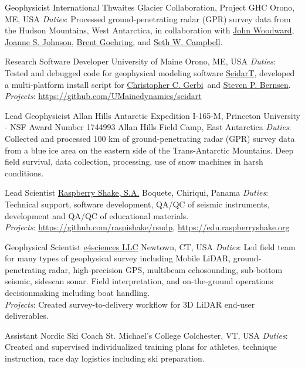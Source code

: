 \documentclass[a4paper,12pt,sans,colorlinks]{moderncv}
\newcommand{\seth}{\href{https://www.alpinesciences.net}{Seth W. Campbell}}
\newcommand{\stevebernsen}{\href{https://watc.alaska.edu/node/73}{Steven P. Bernsen}}
\newcommand{\chris}{\href{https://umaine.edu/earthclimate/people/christopher-gerbi/}{Christopher C. Gerbi}}
\newcommand{\johnwoodward}{\href{https://www.northumbria.ac.uk/about-us/our-staff/w/john-woodward}{John Woodward}}
\newcommand{\joannejohnson}{\href{https://www.bas.ac.uk/profile/jsj/}{Joanne S. Johnson}}
\newcommand{\brent}{\href{https://sse.tulane.edu/eens/faculty/goehring}{Brent Goehring}}
\newcommand{\seidart}{\href{https://github.com/UMainedynamics/SeidarT}{SeidarT}}
\newcommand{\raspishake}{\href{https://raspberryshake.org}{Raspberry Shake, S.A.}}
\newcommand{\efour}{\href{https://e4sciences.com}{e4sciences LLC}}
\begin{document}
{Geophysicist}
{International Thwaites Glacier Collaboration, Project GHC}
{Orono, ME, USA}
{}
{
    \emph{Duties}: Processed ground-penetrating radar (GPR) survey data
    from the Hudson Mountains, West Antarctica, in collaboration with
    \johnwoodward, \joannejohnson, \brent, and \seth.
}

{Research Software Developer}
{University of Maine}
{Orono, ME, USA}
{}
{
    \emph{Duties}: Tested and debugged code for geophysical modeling software
    \seidart, developed a multi-platform install script for \chris\ and
    \stevebernsen.
    \\
    \emph{Projects}: \url{https://github.com/UMainedynamics/seidart}
}

{Lead Geophysicist}
{Allan Hills Antarctic Expedition I-165-M,
Princeton University - NSF Award Number 1744993}
{Allan Hills Field Camp, East Antarctica}
{}
{
    \emph{Duties}: Collected and processed 100 km of ground-penetrating
    radar (GPR) survey data from a blue ice area on the eastern side of the
    Trans-Antarctic Mountains. Deep field survival, data collection,
    processing, use of snow machines in harsh conditions.
}

{Lead Scientist}
{\raspishake{}}
{Boquete, Chiriqui, Panama}
{}
{
    \emph{Duties}: Technical support, software development,
    QA/QC of seismic instruments, development and QA/QC of
    educational materials.
    \\
    \emph{Projects}: \url{https://github.com/raspishake/rsudp},
    \url{https://edu.raspberryshake.org}
}

{Geophysical Scientist}
{\efour{}}
{Newtown, CT, USA}
{}
{
    \emph{Duties}: Led field team for many types of geophysical survey
    including Mobile LiDAR, ground-penetrating radar, high-precision GPS,
    multibeam echosounding, sub-bottom seismic, sidescan sonar. Field
    interpretation, and on-the-ground operations decisionmaking including
    boat handling.
    \\
    \emph{Projects}: Created survey-to-delivery workflow for 3D LiDAR
    end-user deliverables.
}

{Assistant Nordic Ski Coach}
{St. Michael's College}
{Colchester, VT, USA}
{}
{
    \emph{Duties}: Created and supervised individualized training plans
    for athletes, technique instruction, race day logistics including
    ski preparation.
}
\end{document}
